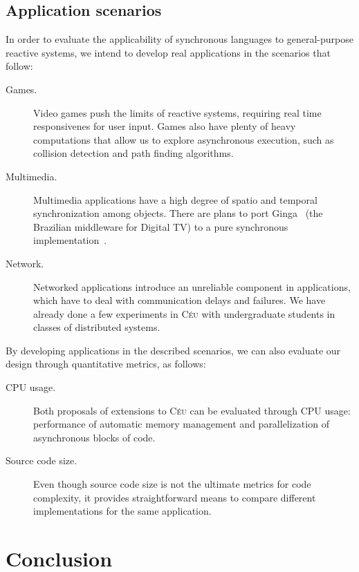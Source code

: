 \documentclass[pdftex,12pt,a4paper]{article}
\newcommand{\CEU}{\textsc{C\'{e}u}\xspace}
\begin{document}
\subsection{Application scenarios}

In order to evaluate the applicability of synchronous languages to 
general-purpose reactive systems, we intend to develop real applications in the
scenarios that follow:

\begin{description}
    \item [Games.]
    Video games push the limits of reactive systems, requiring real time 
    responsivenes for user input.
    Games also have plenty of heavy computations that allow us to explore 
    asynchronous execution, such as collision detection and path finding 
algorithms.

    \item [Multimedia.]
    Multimedia applications have a high degree of spatio and temporal 
    synchronization among objects.
    There are plans to port Ginga~\cite{ncl} (the Brazilian middleware for 
    Digital TV) to a pure synchronous implementation~\cite{ncl.sync}.

    \item [Network.]
    Networked applications introduce an unreliable component in applications, 
    which have to deal with communication delays and failures.
    We have already done a few experiments in \CEU with undergraduate students 
    in classes of distributed systems.
\end{description}

By developing applications in the described scenarios, we can also evaluate our 
design through quantitative metrics, as follows:

\begin{description}
    \item [CPU usage.]
    Both proposals of extensions to \CEU can be evaluated through CPU usage:
    performance of automatic memory management and
    parallelization of asynchronous blocks of code.
    \item [Source code size.]
    Even though source code size is not the ultimate metrics for code 
    complexity, it provides straightforward means to compare different 
implementations for the same application.
\end{description}

\section{Conclusion}
\end{document}
